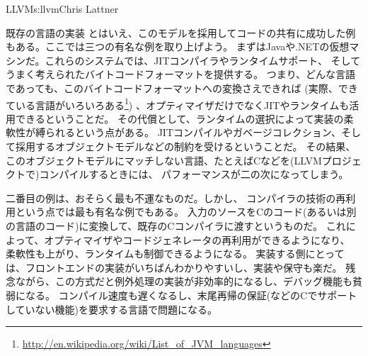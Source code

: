 \begin{aosachapter}{LLVM}{s:llvm}{Chris Lattner}
\begin{aosasect1}{既存の言語の実装}
とはいえ、このモデルを採用してコードの共有に成功した例もある。ここでは三つの有名な例を取り上げよう。
まずはJavaや.NETの仮想マシンだ。これらのシステムでは、JITコンパイラやランタイムサポート、
そしてうまく考えられたバイトコードフォーマットを提供する。
つまり、どんな言語であっても、このバイトコードフォーマットへの変換さえできれば
(実際、できている言語がいろいろある\footnote{\url{http://en.wikipedia.org/wiki/List_of_JVM_languages}})
、オプティマイザだけでなくJITやランタイムも活用できるということだ。
その代償として、ランタイムの選択によって実装の柔軟性が縛られるという点がある。
JITコンパイルやガベージコレクション、そして採用するオブジェクトモデルなどの制約を受けるということだ。
その結果、このオブジェクトモデルにマッチしない言語、たとえばCなどを(LLVMプロジェクトで)コンパイルするときには、
パフォーマンスが二の次になってしまう。

二番目の例は、おそらく最も不運なものだ。しかし、
コンパイラの技術の再利用という点では最も有名な例でもある。
入力のソースをCのコード(あるいは別の言語のコード)に変換して、既存のCコンパイラに渡すというものだ。
これによって、オプティマイザやコードジェネレータの再利用ができるようになり、
柔軟性も上がり、ランタイムも制御できるようになる。
実装する側にとっては、フロントエンドの実装がいちばんわかりやすいし、実装や保守も楽だ。
残念ながら、この方式だと例外処理の実装が非効率的になるし、デバッグ機能も貧弱になる。
コンパイル速度も遅くなるし、末尾再帰の保証(などのCでサポートしていない機能)を要求する言語で問題になる。


\end{aosasect1}
\end{aosachapter}
